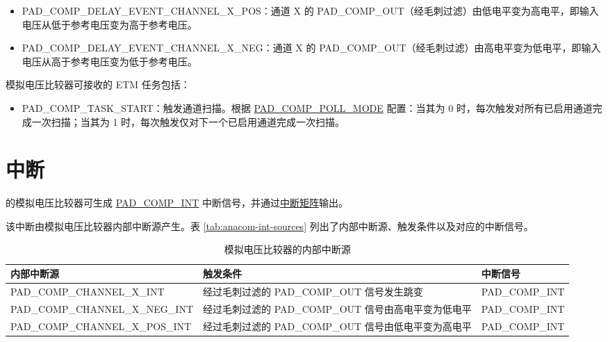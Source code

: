 \documentclass[main\_\_CN.tex]{subfiles}
\begin{document}
\begin{itemize}
    \item PAD\_COMP\_DELAY\_EVENT\_CHANNEL\_X\_POS：通道 X 的 PAD\_COMP\_OUT（经毛刺过滤）由低电平变为高电平，即输入电压从低于参考电压变为高于参考电压。
    \item PAD\_COMP\_DELAY\_EVENT\_CHANNEL\_X\_NEG：通道 X 的 PAD\_COMP\_OUT（经毛刺过滤）由高电平变为低电平，即输入电压从高于参考电压变为低于参考电压。
\end{itemize}

模拟电压比较器可接收的 ETM 任务包括：
\begin{itemize}
        \item PAD\_COMP\_TASK\_START：触发通道扫描。根据 \hyperref[fielddesc:PADCOMPPOLLMODE]{PAD\_COMP\_POLL\_MODE} 配置：当其为 0 时，每次触发对所有已启用通道完成一次扫描；当其为 1 时，每次触发仅对下一个已启用通道完成一次扫描。
\end{itemize}



\section{中断}

\chipname{} 的模拟电压比较器可生成 \hyperref[int:PADCOMPINT]{PAD\_COMP\_INT} 中断信号，并通过\hyperref[mod:intmtrx]{中断矩阵}输出。

该中断由模拟电压比较器内部中断源产生。表 \ref{tab:anacom-int-sources} 列出了内部中断源、触发条件以及对应的中断信号。

\begin{table}[H]
\centering
\caption{模拟电压比较器的内部中断源}
\label{tab:anacom-int-sources}
\begin{tabular}{ | L{6cm} | L{5.5cm} | L{4cm} | }
\hline
{}
\textbf{内部中断源} & \textbf{触发条件}  &  \textbf{中断信号}\\ \hline
\label{int:PADCOMPnALLINT}PAD\_COMP\_CHANNEL\_X\_INT  & 经过毛刺过滤的 PAD\_COMP\_OUT 信号发生跳变  &  \label{int:PADCOMPINT}PAD\_COMP\_INT  \\ \hline
\label{int:PADCOMPnNEGINT}PAD\_COMP\_CHANNEL\_X\_NEG\_INT  & 经过毛刺过滤的 PAD\_COMP\_OUT 信号由高电平变为低电平   & PAD\_COMP\_INT \\ \hline
\label{int:PADCOMPnPOSINT}PAD\_COMP\_CHANNEL\_X\_POS\_INT & 经过毛刺过滤的 PAD\_COMP\_OUT 信号由低电平变为高电平  & PAD\_COMP\_INT \\ \hline
\end{tabular}
\end{table}
\end{document}
